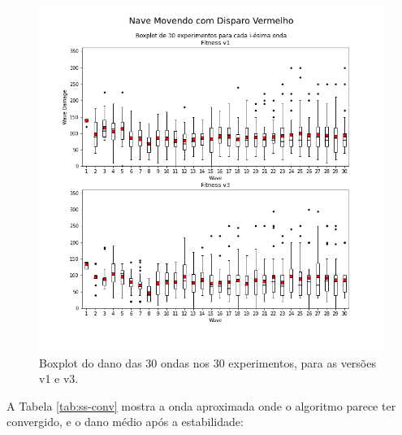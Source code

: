 \begin{figure}
  \centering
  \includegraphics[width=1.1\textwidth]{figuras/ss/boxplot Nave Movendo com Disparo Vermelho.png}
  \caption{Boxplot do dano das 30 ondas nos 30 experimentos, para as versões v1 e v3.}
  \label{ss-box-rg}
\end{figure}

A Tabela \ref{tab:ss-conv} mostra a onda aproximada onde o algoritmo parece ter convergido, e o dano médio após a estabilidade:

